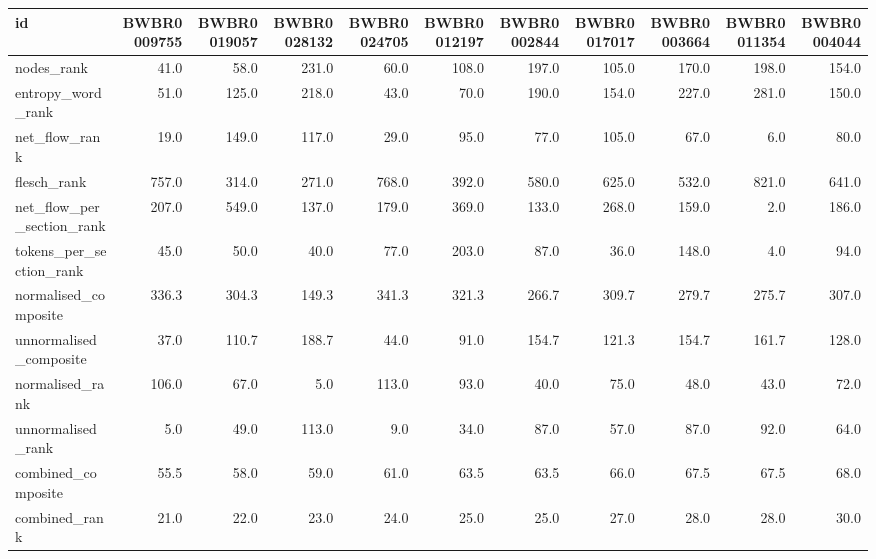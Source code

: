 \begin{tabular}{lrrrrrrrrrr}
\toprule
id & BWBR0009755 & BWBR0019057 & BWBR0028132 & BWBR0024705 & BWBR0012197 & BWBR0002844 & BWBR0017017 & BWBR0003664 & BWBR0011354 & BWBR0004044 \\
\midrule
nodes\_rank & 41.0 & 58.0 & 231.0 & 60.0 & 108.0 & 197.0 & 105.0 & 170.0 & 198.0 & 154.0 \\
\cline{1-11}
entropy\_word\_rank & 51.0 & 125.0 & 218.0 & 43.0 & 70.0 & 190.0 & 154.0 & 227.0 & 281.0 & 150.0 \\
\cline{1-11}
net\_flow\_rank & 19.0 & 149.0 & 117.0 & 29.0 & 95.0 & 77.0 & 105.0 & 67.0 & 6.0 & 80.0 \\
\cline{1-11}
flesch\_rank & 757.0 & 314.0 & 271.0 & 768.0 & 392.0 & 580.0 & 625.0 & 532.0 & 821.0 & 641.0 \\
\cline{1-11}
net\_flow\_per\_section\_rank & 207.0 & 549.0 & 137.0 & 179.0 & 369.0 & 133.0 & 268.0 & 159.0 & 2.0 & 186.0 \\
\cline{1-11}
tokens\_per\_section\_rank & 45.0 & 50.0 & 40.0 & 77.0 & 203.0 & 87.0 & 36.0 & 148.0 & 4.0 & 94.0 \\
\cline{1-11}
normalised\_composite & 336.3 & 304.3 & 149.3 & 341.3 & 321.3 & 266.7 & 309.7 & 279.7 & 275.7 & 307.0 \\
\cline{1-11}
unnormalised\_composite & 37.0 & 110.7 & 188.7 & 44.0 & 91.0 & 154.7 & 121.3 & 154.7 & 161.7 & 128.0 \\
\cline{1-11}
normalised\_rank & 106.0 & 67.0 & 5.0 & 113.0 & 93.0 & 40.0 & 75.0 & 48.0 & 43.0 & 72.0 \\
\cline{1-11}
unnormalised\_rank & 5.0 & 49.0 & 113.0 & 9.0 & 34.0 & 87.0 & 57.0 & 87.0 & 92.0 & 64.0 \\
\cline{1-11}
combined\_composite & 55.5 & 58.0 & 59.0 & 61.0 & 63.5 & 63.5 & 66.0 & 67.5 & 67.5 & 68.0 \\
\cline{1-11}
combined\_rank & 21.0 & 22.0 & 23.0 & 24.0 & 25.0 & 25.0 & 27.0 & 28.0 & 28.0 & 30.0 \\
\cline{1-11}
\bottomrule
\end{tabular}
